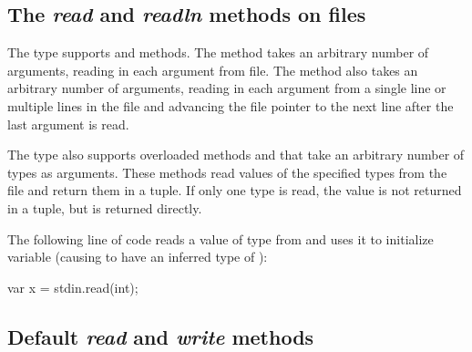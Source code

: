 \subsection{The {\em read} and {\em readln} methods on files}
\label{fileread}

The  type supports  and  methods.
The  method takes an arbitrary number of arguments, reading
in each argument from file.  The  method also
takes an arbitrary number of arguments, reading in each argument
from a single line or multiple lines in the file and 
advancing the file pointer to the next line after the last argument 
is read.

The  type also supports overloaded methods 
and  that take an arbitrary number of types as arguments.
These methods read values of the specified types from the file and
return them in a tuple.  If only one type is read, the value is not
returned in a tuple, but is returned directly.

\begin{example}
The following line of code reads a value of type  from
 and uses it to initialize variable  (causing
 to have an inferred type of ):
\begin{chapel}
var x = stdin.read(int);
\end{chapel}
\end{example}


\subsection{Default {\em read} and {\em write} methods}

